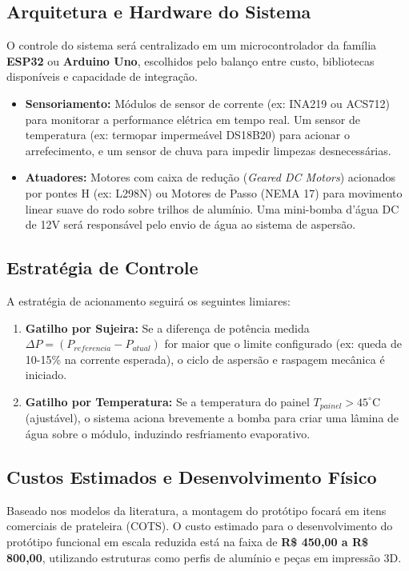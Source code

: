 \documentclass[12pt, a4paper]{article}
\begin{document}
\subsection{Arquitetura e Hardware do Sistema}
O controle do sistema será centralizado em um microcontrolador da família \textbf{ESP32} ou \textbf{Arduino Uno}, escolhidos pelo balanço entre custo, bibliotecas disponíveis e capacidade de integração.
\begin{itemize}
    \item \textbf{Sensoriamento:} Módulos de sensor de corrente (ex: INA219 ou ACS712) para monitorar a performance elétrica em tempo real. Um sensor de temperatura (ex: termopar impermeável DS18B20) para acionar o arrefecimento, e um sensor de chuva para impedir limpezas desnecessárias.
    \item \textbf{Atuadores:} Motores com caixa de redução (\textit{Geared DC Motors}) acionados por pontes H (ex: L298N) ou Motores de Passo (NEMA 17) para movimento linear suave do rodo sobre trilhos de alumínio. Uma mini-bomba d'água DC de 12V será responsável pelo envio de água ao sistema de aspersão.
\end{itemize}

\subsection{Estratégia de Controle}
A estratégia de acionamento seguirá os seguintes limiares:
\begin{enumerate}
    \item \textbf{Gatilho por Sujeira:} Se a diferença de potência medida $\Delta P = (P_{referencia} - P_{atual})$ for maior que o limite configurado (ex: queda de 10-15\% na corrente esperada), o ciclo de aspersão e raspagem mecânica é iniciado.
    \item \textbf{Gatilho por Temperatura:} Se a temperatura do painel $T_{painel} > 45^\circ\text{C}$ (ajustável), o sistema aciona brevemente a bomba para criar uma lâmina de água sobre o módulo, induzindo resfriamento evaporativo.
\end{enumerate}

\subsection{Custos Estimados e Desenvolvimento Físico}
Baseado nos modelos da literatura, a montagem do protótipo focará em itens comerciais de prateleira (COTS). O custo estimado para o desenvolvimento do protótipo funcional em escala reduzida está na faixa de \textbf{R\$ 450,00 a R\$ 800,00}, utilizando estruturas como perfis de alumínio e peças em impressão 3D.
\end{document}
